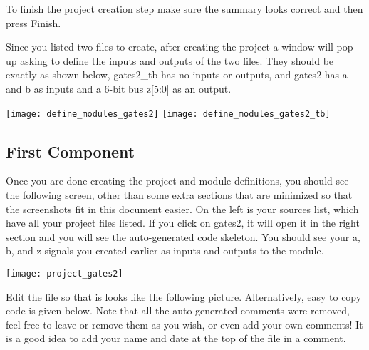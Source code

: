 To finish the project creation step make sure the summary looks correct and then press Finish.

\begin{center}
\end{center}

Since you listed two files to create, after creating the project a window will pop-up asking to
define the inputs and outputs of the two files.
They should be exactly as shown below, gates2\_tb has no inputs or outputs, and gates2 has a and b
as inputs and a 6-bit bus z[5:0] as an output.

\begin{center}
    \texttt{[image: define\_modules\_gates2]}
    \texttt{[image: define\_modules\_gates2\_tb]}
\end{center}

\subsection{First Component}

Once you are done creating the project and module definitions, you should see the following
screen, other than some extra sections that are minimized so that the screenshots fit in this
document easier.
On the left is your sources list, which have all your project files listed.
If you click on gates2, it will open it in the right section and you will see the auto-generated
code skeleton.
You should see your a, b, and z signals you created earlier as inputs and outputs to the module.

\begin{center}
    \texttt{[image: project\_gates2]}
\end{center}

Edit the file so that is looks like the following picture.
Alternatively, easy to copy code is given below.
Note that all the auto-generated comments were removed, feel free to leave or remove them as
you wish, or even add your own comments! It is a good idea to add your name and date at the top
of the file in a comment.

